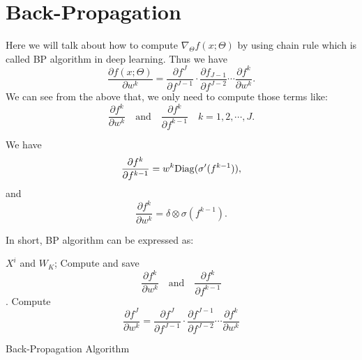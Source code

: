 
\section{Back-Propagation}
Here we will talk about how to compute $\nabla_{\Theta} f(x;\Theta)$ by using chain rule which is called BP algorithm in deep learning. 
Thus we have
\begin{equation}
\frac{\partial {f}(x; \Theta)}{ \partial w^k} = \frac{\partial {f}^J}{\partial {f}^{J-1}} \cdot \frac{ \partial {f}_{J-1}}{\partial {f}^{J-2}} \cdots \frac{ \partial {f}^k}{\partial w^k}.
\end{equation}
We can see from the above that, we only need to compute those terms like:
\begin{equation}
 \frac{ \partial {f}^k}{\partial w^{k}}  \quad \text{and} \quad \frac{\partial {f}^k}{\partial {f}^{k-1}}  \quad k = 1,2,\cdots,J.
\end{equation}


We have
\begin{equation}\label{eq:partial-f}
 \frac{\partial {f}^k}{\partial {f}^{k-1}} =
w^k{\rm Diag}(\sigma'(f^{k-1})) ,
\end{equation}
and
\begin{equation}
\frac{ \partial {f}^k}{\partial w^{k}}  = \delta \otimes \sigma(f^{k-1}).
\end{equation}


In short, BP algorithm can be expressed as:
\begin{algorithm}[H]
\begin{algorithmic}[1]
  $X^i$ and $W_K$;
\State Compute and save
$$\frac{ \partial {f}^k}{\partial w^{k}}  \quad \text{and} \quad \frac{\partial {f}^k}{\partial {f}^{k-1}}$$.
\State Compute
    $$\frac{ \partial {f}^J}{\partial w^{k}} = \frac{\partial {f}^J}{\partial {f}^{J-1}} \cdot \frac{ \partial {f}^{J-1}}{\partial {f}^{J-2}} \cdots \frac{ \partial {f}^k}{\partial w^{k}}$$ 
\EndFor
\end{algorithmic}
\caption{Back-Propagation Algorithm}
\end{algorithm}

